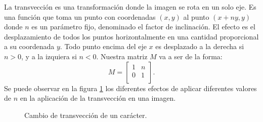 			La transvección es una transformación donde la imagen se rota en un solo eje. Es una función que toma un punto con coordenadas $(x,y)$ al punto $(x +ny, y)$ donde $n$ es un parámetro fijo, denominado el factor de inclinación. El efecto es el desplazamiento de todos los puntos horizontalmente en una cantidad proporcional a su coordenada $y$. Todo punto encima del eje $x$ es desplazado a la derecha si $n > 0$, y a la izquiera si $n < 0$. Nuestra matriz $M$ va a ser de la forma:
			\begin{equation}
				M = 
				\begin{bmatrix}
					1 & n \\
					0 & 1 \\
				\end{bmatrix}.
			\end{equation}
		Se puede observar en la figura \ref{fig: Transformacion Afin - Transveccion} los diferentes efectos de aplicar diferentes valores de $n$ en la aplicación de la transvección en una imagen.
		\begin{figure}[htbp]
			\centering
			\caption[Transvección de un caracter]{Cambio de transvección de un carácter.}
			\label{fig: Transformacion Afin - Transveccion}
		\end{figure}	
		
